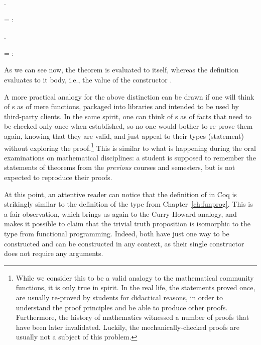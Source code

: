\begin{coqdoccode}
\coqdocemptyline
\coqdocnoindent
{}   .\coqdoceol
\end{coqdoccode}
 =  : 
\begin{coqdoccode}
\coqdocemptyline
\coqdocnoindent
{}   .\coqdoceol
\end{coqdoccode}
 =  : 


As we can see now, the theorem is evaluated to itself, whereas the
definition evaluates to it body, i.e., the value of the constructor
.  






A more practical analogy for the above distinction can be drawn if one
will think of s as of mere functions, packaged into
libraries and intended to be used by third-party clients. In the same
spirit, one can think of s as of facts that need to be
checked only once when established, so no one would bother to re-prove
them again, knowing that they are valid, and just appeal to their
types (statement) without exploring the proof.\footnote{While we
consider this to be a valid analogy to the mathematical community
functions, it is only true in spirit. In the real life, the statements
proved once, are usually re-proved by students for didactical reasons,
in order to understand the proof principles and be able to produce
other proofs. Furthermore, the history of mathematics witnessed a
number of proofs that have been later invalidated. Luckily, the
mechanically-checked proofs are usually not a subject of this
problem.} This is similar to what is happening during the oral
examinations on mathematical disciplines: a student is supposed to
remember the statements of theorems from the \textit{previous} courses and
semesters, but is not expected to reproduce their proofs.


At this point, an attentive reader can notice that the definition of
 in Coq is strikingly similar to the definition of the type
 from Chapter~\ref{ch:funprog}. This is a fair observation,
which brings us again to the Curry-Howard analogy, and makes it
possible to claim that the trivial truth proposition is isomorphic to
the  type from functional programming. Indeed, both have just
one way to be constructed and can be constructed in any context, as
their single constructor does not require any arguments.


